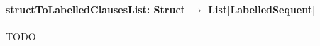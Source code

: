 \documentclass[a4paper,11pt]{article}
\begin{document}
\begin{appendix}
\paragraph{\textbf{structToLabelledClausesList: Struct $\rightarrow$ List[LabelledSequent]}}
{\color{red}TODO}


% 
% 
% 
% 
% 
% 
% 
% 
% 
% 

\end{appendix}
\end{document}
